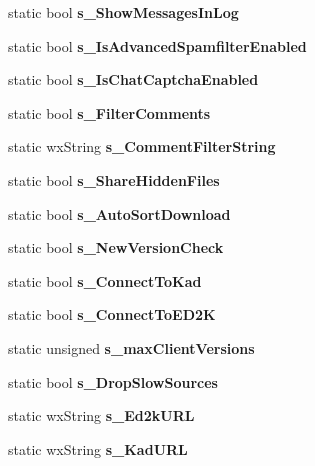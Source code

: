\begin{DoxyCompactItemize}
\item 
static bool {\bfseries s\_\-ShowMessagesInLog}\label{classCPreferences_ae42329db29fffe233e0fda4c332e05c4}

\item 
static bool {\bfseries s\_\-IsAdvancedSpamfilterEnabled}\label{classCPreferences_a4ca8ab9c47a54670c27808302eaded9c}

\item 
static bool {\bfseries s\_\-IsChatCaptchaEnabled}\label{classCPreferences_a1032f49f709cd839d2575ce8137d9c2c}

\item 
static bool {\bfseries s\_\-FilterComments}\label{classCPreferences_ad920967a3990ee264fa6018f49cc0d86}

\item 
static wxString {\bfseries s\_\-CommentFilterString}\label{classCPreferences_a221c559cd3c957b0a5ac1a6e598ecb19}

\item 
static bool {\bfseries s\_\-ShareHiddenFiles}\label{classCPreferences_af6a40386282c32b9b5ef091811d548a4}

\item 
static bool {\bfseries s\_\-AutoSortDownload}\label{classCPreferences_af18bc84c6d5ee745bcbae60869e290f0}

\item 
static bool {\bfseries s\_\-NewVersionCheck}\label{classCPreferences_a94532d5c6f50505a9c882ebebcca1040}

\item 
static bool {\bfseries s\_\-ConnectToKad}\label{classCPreferences_a82c486a263e51660fc8632245c7942e9}

\item 
static bool {\bfseries s\_\-ConnectToED2K}\label{classCPreferences_a420699899d096443fe1c9fc0df823939}

\item 
static unsigned {\bfseries s\_\-maxClientVersions}\label{classCPreferences_ab49013ef5844d2ecd16be86ed7ba955b}

\item 
static bool {\bfseries s\_\-DropSlowSources}\label{classCPreferences_a4179c0e9b98cb96dc62de0195864868e}

\item 
static wxString {\bfseries s\_\-Ed2kURL}\label{classCPreferences_ab854f7138cc5b7bcaa707a56b1a85216}

\item 
static wxString {\bfseries s\_\-KadURL}\label{classCPreferences_a001b1f81d836238df5ef3326bcd4fb59}


\end{DoxyCompactItemize}
